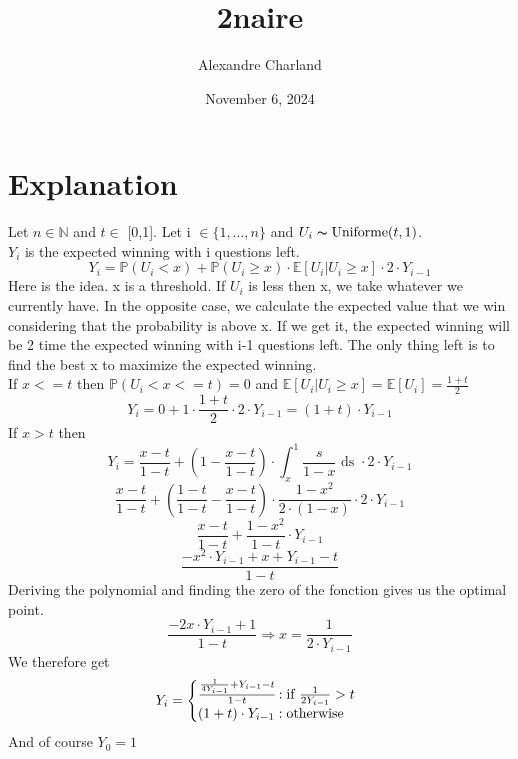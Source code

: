 \documentclass{article}
\title{2naire}
\author{Alexandre Charland}
\date{November 6, 2024}
\begin{document}
\maketitle

\section{Explanation}
Let $n \in \mathbb{N}$ and $t \in$ [0,1]. Let i $\in \{1,\ldots,n\}$ and $U_{i} \thicksim \text{Uniforme}(t,1)$.\\ 
$Y_{i}$ is the expected winning with i questions left.
\[ Y_{i} = \mathbb{P}(U_{i}<x)+\mathbb{P}(U_{i}\ge x)\cdot \mathbb{E}[U_{i}|U_{i}\ge x]\cdot 2\cdot Y_{i-1} \]
Here is the idea. x is a threshold. If $U_{i}$ is less then x, we take whatever we currently have. In the opposite case, we calculate the expected value that we win considering that the probability is above x. If we get it, the expected winning will be 2 time the expected winning with i-1 questions left. The only thing left is to find the best x to maximize the expected winning.\\
If $x<=t$ then
$\mathbb{P}(U_{i}<x<=t) = 0$ and $\mathbb{E}[U_{i}|U_{i}\ge x] = \mathbb{E}[U_{i}] = \frac{1+t}{2}$
\[ Y_{i}=0+1\cdot \frac{1+t}{2}\cdot 2\cdot Y_{i-1} = (1+t)\cdot Y_{i-1} \]
If $x>t$ then
\[ Y_{i} = \frac{x-t}{1-t}+(1-\frac{x-t}{1-t})\cdot \int_{x}^{1} \frac{s}{1-x}\text{ ds }\cdot 2\cdot Y_{i-1} \]
\[ \frac{x-t}{1-t}+(\frac{1-t}{1-t}-\frac{x-t}{1-t})\cdot \frac{1-x^{2}}{2\cdot (1-x)} \cdot 2\cdot Y_{i-1} \]
\[ \frac{x-t}{1-t}+\frac{1-x^{2}}{1-t}\cdot Y_{i-1} \]
\[ \frac{-x^{2}\cdot Y_{i-1} + x + Y_{i-1} -t}{1-t} \]
Deriving the polynomial and finding the zero of the fonction gives us the optimal point.
\[ \frac{-2x\cdot Y_{i-1}+1}{1-t} \Rightarrow x=\frac{1}{2\cdot Y_{i-1}} \]
We therefore get
\[ Y_{i}=\left\{
     \begin{array}{@{}l@{\thinspace}l}
       \frac{\frac{1}{4Y_{i-1}}+Y_{i-1}-t}{1-t} &:\text{if } \frac{1}{2Y_{i-1}}>t\\
       (1+t)\cdot Y_{i-1} &: \text{otherwise}\\
     \end{array}
   \right. \]
And of course $Y_{0}=1$
\end{document}
